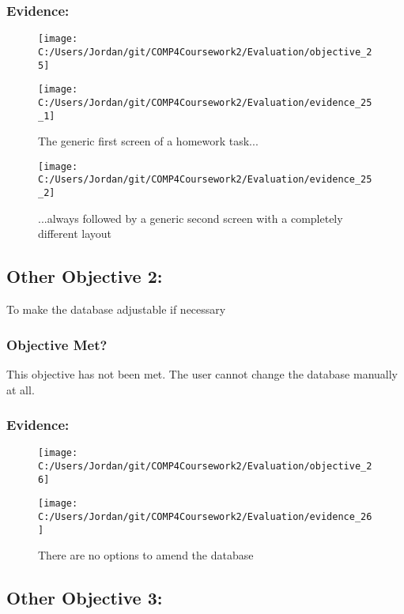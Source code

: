 \subsubsection{Evidence: }

\begin{figure}[H]
	\texttt{[image: C:/Users/Jordan/git/COMP4Coursework2/Evaluation/objective\_25]}
\end{figure}

\begin{figure}[H]
	\texttt{[image: C:/Users/Jordan/git/COMP4Coursework2/Evaluation/evidence\_25\_1]}
	\caption{The generic first screen of a homework task...}
\end{figure}

\begin{figure}[H]
	\texttt{[image: C:/Users/Jordan/git/COMP4Coursework2/Evaluation/evidence\_25\_2]}
	\caption{...always followed by a generic second screen with a completely different layout}
\end{figure}

\subsection{Other Objective 2: }

To make the database adjustable if necessary

\subsubsection{Objective Met?}

This objective has not been met. The user cannot change the database manually at all.

\subsubsection{Evidence: }

\begin{figure}[H]
	\texttt{[image: C:/Users/Jordan/git/COMP4Coursework2/Evaluation/objective\_26]}
\end{figure}

\begin{figure}[H]
	\texttt{[image: C:/Users/Jordan/git/COMP4Coursework2/Evaluation/evidence\_26]}
	\caption{There are no options to amend the database}
\end{figure}

\subsection{Other Objective 3: }

